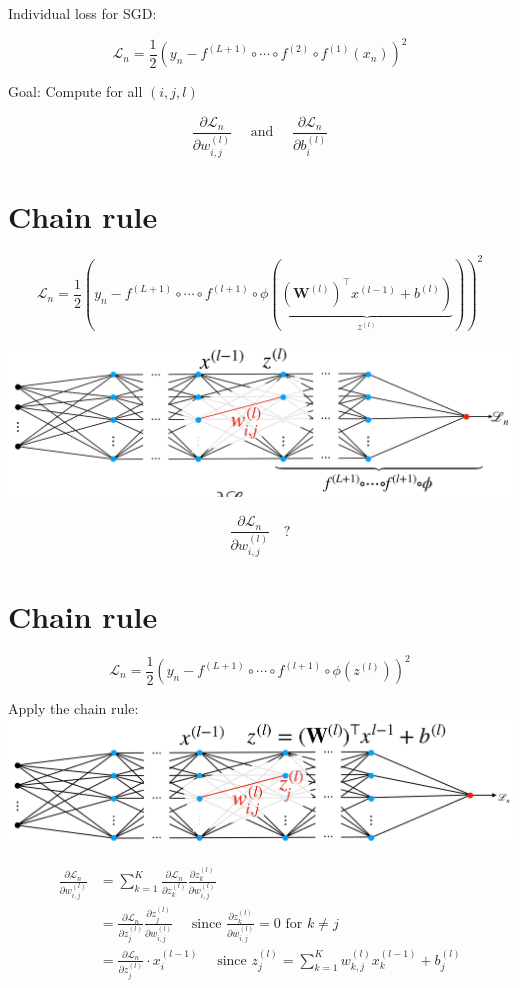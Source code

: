 \documentclass[10pt]{article}
\begin{document}
Individual loss for SGD:

$$
\mathscr{L}_{n}=\frac{1}{2}\left(y_{n}-f^{(L+1)} \circ \cdots \circ f^{(2)} \circ f^{(1)}\left(x_{n}\right)\right)^{2}
$$

Goal: Compute for all $(i, j, l)$

$$
\frac{\partial \mathscr{L}_{n}}{\partial w_{i, j}^{(l)}} \quad \text { and } \quad \frac{\partial \mathscr{L}_{n}}{\partial b_{i}^{(l)}}
$$

\section*{Chain rule}
$$
\mathscr{L}_{n}=\frac{1}{2}\left(y_{n}-f^{(L+1)} \circ \cdots \circ f^{(l+1)} \circ \phi(\underbrace{\left.\left(\mathbf{W}^{(l)}\right)^{\top} x^{(l-1)}+b^{(l)}\right)}_{z^{(l)}})\right)^{2}
$$

\begin{center}
\includegraphics[max width=\textwidth]{2023_12_30_360102aa01a03e5a4270g-13}
\end{center}

$$
\frac{\partial \mathscr{L}_{n}}{\partial w_{i, j}^{(l)}} \quad ?
$$

\section*{Chain rule}
$$
\mathscr{L}_{n}=\frac{1}{2}\left(y_{n}-f^{(L+1)} \circ \cdots \circ f^{(l+1)} \circ \phi\left(z^{(l)}\right)\right)^{2}
$$

Apply the chain rule:
\includegraphics[max width=\textwidth, center]{2023_12_30_360102aa01a03e5a4270g-14}

$$
\begin{aligned}
\frac{\partial \mathscr{L}_{n}}{\partial w_{i, j}^{(l)}} & =\sum_{k=1}^{K} \frac{\partial \mathscr{L}_{n}}{\partial z_{k}^{(l)}} \frac{\partial z_{k}^{(l)}}{\partial w_{i, j}^{(l)}} \\
& =\frac{\partial \mathscr{L}_{n}}{\partial z_{j}^{(l)}} \frac{\partial z_{j}^{(l)}}{\partial w_{i, j}^{(l)}} \quad \text { since } \frac{\partial z_{k}^{(l)}}{\partial w_{i, j}^{(l)}}=0 \text { for } k \neq j \\
& =\frac{\partial \mathscr{L}_{n}}{\partial z_{j}^{(l)}} \cdot x_{i}^{(l-1)} \quad \text { since } z_{j}^{(l)}=\sum_{k=1}^{K} w_{k, j}^{(l)} x_{k}^{(l-1)}+b_{j}^{(l)}
\end{aligned}
$$
\end{document}
